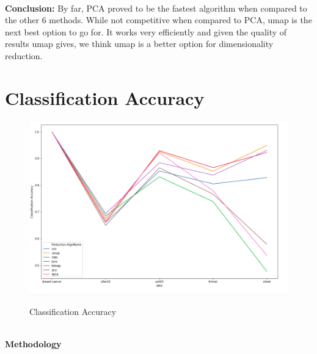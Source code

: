 \documentclass[letterpaper, 10 pt, conference]{ieeeconf}  %
\begin{document}
\vspace{3mm}
\\\textbf{Conclusion: }
By far, PCA proved to be the fastest algorithm when compared to the other 6 methods. While not competitive when compared to PCA, umap is the next best option to go for. It works very efficiently and given the quality of results umap gives, we think umap is a better option for dimensionality reduction.

\section{Classification Accuracy}

\begin{figure}[h!]
	\centering
	\includegraphics[width=0.94\linewidth]{class_acc.png}
	\label{fig:class_acc}
	\caption{Classification Accuracy}
\end{figure}
\\\textbf{Methodology}
\end{document}
